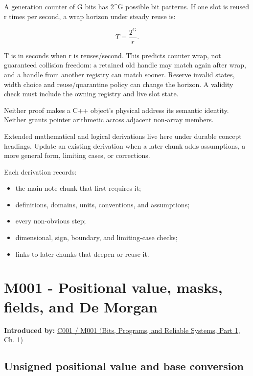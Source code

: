A generation counter of G bits has 2\^{}G possible bit patterns. If one slot is reused r times per second, a wrap horizon under steady reuse is:

\[
T=\frac{2^G}{r}.
\]

T is in seconds when r is reuses/second. This predicts counter wrap, not guaranteed collision freedom: a retained old handle may match again after wrap, and a handle from another registry can match sooner. Reserve invalid states, width choice and reuse/quarantine policy can change the horizon. A validity check must include the owning registry and live slot state.

Neither proof makes a C++ object's physical address its semantic identity. Neither grants pointer arithmetic across adjacent non-array members.

Extended mathematical and logical derivations live here under durable concept headings. Update an existing derivation when a later chunk adds assumptions, a more general form, limiting cases, or corrections.

Each derivation records:

\begin{itemize}
\tightlist
\item
  the main-note chunk that first requires it;
\item
  definitions, domains, units, conventions, and assumptions;
\item
  every non-obvious step;
\item
  dimensional, sign, boundary, and limiting-case checks;
\item
  links to later chunks that deepen or reuse it.
\end{itemize}

\section{M001 - Positional value, masks, fields, and De Morgan}\label{03-visual-computing-i-ch018-m001---positional-value-masks-fields-and-de-morgan}

\hypertarget{03-visual-computing-i-ch018-m001---positional-value-masks-fields-and-de-morgan}{}

\textbf{Introduced by:} \href{../01-Bits-Programs-and-Reliable-Systems-P01/main.pdf\#nameddest=01-foundations-i-ch001-from-a-signal-to-an-interpretation}{C001 / M001 (Bits, Programs, and Reliable Systems, Part 1, Ch. 1)}

\subsection{Unsigned positional value and base conversion}\label{03-visual-computing-i-ch018-unsigned-positional-value-and-base-conversion}

